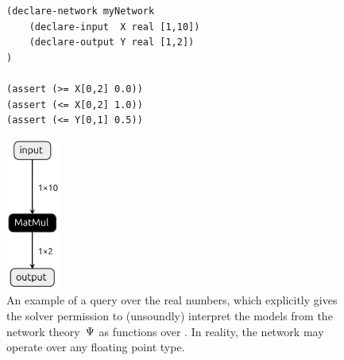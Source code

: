 \begin{figure}[t]
    \begin{minipage}[c]{0.62\textwidth}
        \begin{lstlisting}[style=lbnf]
(declare-network myNetwork
    (declare-input  X real [1,10])
    (declare-output Y real [1,2])
)

(assert (>= X[0,2] 0.0))
(assert (<= X[0,2] 1.0))
(assert (<= Y[0,1] 0.5))\end{lstlisting}
    \end{minipage}%
    \begin{minipage}[c]{0.35\textwidth}
        \centering
        \includegraphics[height=5cm]{imgs/simple_net.onnx.png}
    \end{minipage}
    \caption{An example of a \vnnlib{} query over the real numbers, which explicitly gives the solver permission to (unsoundly) interpret the models from the network theory~$\Psi$ as functions over \real. In reality, the network may operate over any floating point type.}
    \label{fig:real-simple-query}
\end{figure}

